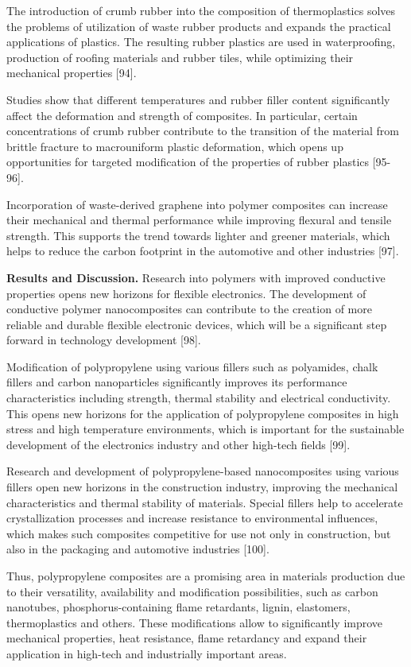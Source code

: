 \begin{multicols}{2}
The introduction of crumb rubber into the composition of thermoplastics
solves the problems of utilization of waste rubber products and expands
the practical applications of plastics. The resulting rubber plastics
are used in waterproofing, production of roofing materials and rubber
tiles, while optimizing their mechanical properties {[}94{]}.

Studies show that different temperatures and rubber filler content
significantly affect the deformation and strength of composites. In
particular, certain concentrations of crumb rubber contribute to the
transition of the material from brittle fracture to macrouniform plastic
deformation, which opens up opportunities for targeted modification of
the properties of rubber plastics {[}95-96{]}.

Incorporation of waste-derived graphene into polymer composites can
increase their mechanical and thermal performance while improving
flexural and tensile strength. This supports the trend towards lighter
and greener materials, which helps to reduce the carbon footprint in the
automotive and other industries {[}97{]}.

{\bfseries Results and Discussion.} Research into polymers with improved
conductive properties opens new horizons for flexible electronics. The
development of conductive polymer nanocomposites can contribute to the
creation of more reliable and durable flexible electronic devices, which
will be a significant step forward in technology development {[}98{]}.

Modification of polypropylene using various fillers such as polyamides,
chalk fillers and carbon nanoparticles significantly improves its
performance characteristics including strength, thermal stability and
electrical conductivity. This opens new horizons for the application of
polypropylene composites in high stress and high temperature
environments, which is important for the sustainable development of the
electronics industry and other high-tech fields {[}99{]}.

Research and development of polypropylene-based nanocomposites using
various fillers open new horizons in the construction industry,
improving the mechanical characteristics and thermal stability of
materials. Special fillers help to accelerate crystallization processes
and increase resistance to environmental influences, which makes such
composites competitive for use not only in construction, but also in the
packaging and automotive industries {[}100{]}.

Thus, polypropylene composites are a promising area in materials
production due to their versatility, availability and modification
possibilities, such as carbon nanotubes, phosphorus-containing flame
retardants, lignin, elastomers, thermoplastics and others. These
modifications allow to significantly improve mechanical properties, heat
resistance, flame retardancy and expand their application in high-tech
and industrially important areas.


\end{multicols}

